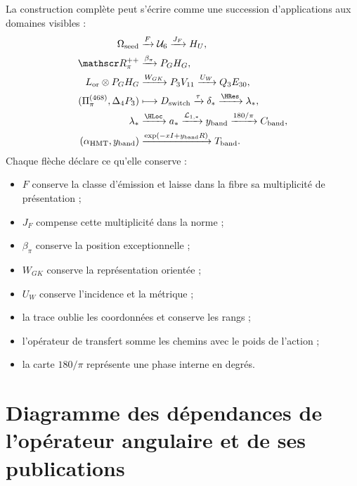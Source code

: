 La construction complète peut s’écrire comme une succession d’applications
aux domaines visibles :
\[
\begin{aligned}
\Omega_{\rm seed}
&\xrightarrow{F}\mathcal U_6
\xrightarrow{J_F}H_U,\\
\mathscr R_\pi^{++}
&\xrightarrow{\beta_\pi}P_GH_G,\\
L_{\rm or}\otimes P_GH_G
&\xrightarrow{W_{GK}}P_3V_{11}
\xrightarrow{U_W}Q_3E_{30},\\
(\Pi_\pi^{(468)},\Delta_4P_3)
&\longmapsto D_{\rm switch}
\xrightarrow{\tau}\delta_*
\xrightarrow{\rm \HRes}\lambda_*,\\
\lambda_*
&\xrightarrow{\rm \HLoc}a_*
\xrightarrow{\mathcal L_{1,*}}y_{\rm band}
\xrightarrow{180/\pi}C_{\rm band},\\
(\alpha_{\rm HMT},y_{\rm band})
&\xrightarrow{\exp(-xI+y_{\rm band}R)}T_{\rm band}.
\end{aligned}
\]
Chaque flèche déclare ce qu’elle conserve :
\begin{itemize}
  \item \(F\) conserve la classe d’émission et laisse dans la fibre sa
  multiplicité de présentation ;
  \item \(J_F\) compense cette multiplicité dans la norme ;
  \item \(\beta_\pi\) conserve la position exceptionnelle ;
  \item \(W_{GK}\) conserve la représentation orientée ;
  \item \(U_W\) conserve l’incidence et la métrique ;
  \item la trace oublie les coordonnées et conserve les rangs ;
  \item l’opérateur de transfert somme les chemins avec le poids de l’action ;
  \item la carte \(180/\pi\) représente une phase interne en degrés.
\end{itemize}

\section{Diagramme des dépendances de l’opérateur angulaire et de ses publications}

